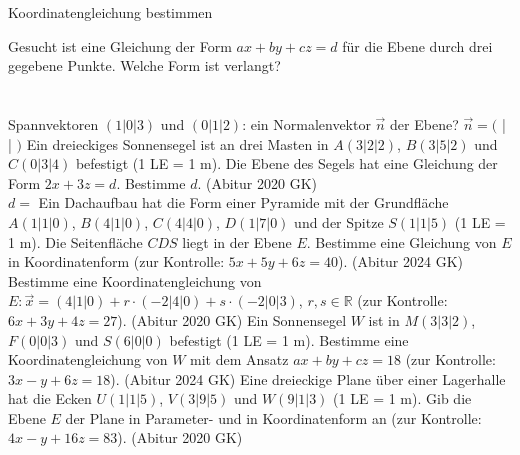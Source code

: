 \setcounter{aufgabe}{11}

\begin{aufgabe}{Koordinatengleichung bestimmen}
\begin{teile}
\teil Gesucht ist eine Gleichung der Form $ax + by + cz = d$ für die Ebene durch drei gegebene Punkte. Welche Form ist verlangt? \\  \\  \\ 
\teil Spannvektoren $(1 | 0 | 3)$ und $(0 | 1 | 2)$: ein Normalenvektor $\vec n$ der Ebene? $\vec n = ($ \leerfeld | \leerfeld | \leerfeld $)$
\teil Ein dreieckiges Sonnensegel ist an drei Masten in $A(3 | 2 | 2)$, $B(3 | 5 | 2)$ und $C(0 | 3 | 4)$ befestigt (1 LE = 1 m). Die Ebene des Segels hat eine Gleichung der Form $2x + 3z = d$. Bestimme $d$. \hfill (Abitur 2020 GK) \\ $d = $ \leerfeld
\teil Ein Dachaufbau hat die Form einer Pyramide mit der Grundfläche $A(1 | 1 | 0)$, $B(4 | 1 | 0)$, $C(4 | 4 | 0)$, $D(1 | 7 | 0)$ und der Spitze $S(1 | 1 | 5)$ (1 LE = 1 m). Die Seitenfläche $CDS$ liegt in der Ebene $E$. Bestimme eine Gleichung von $E$ in Koordinatenform (zur Kontrolle: $5x + 5y + 6z = 40$). \hfill (Abitur 2024 GK)
\teil Bestimme eine Koordinatengleichung von $E\colon \vec x = (4 | 1 | 0) + r \cdot (-2 | 4 | 0) + s \cdot (-2 | 0 | 3)$, $r, s \in \mathbb{R}$ (zur Kontrolle: $6x + 3y + 4z = 27$). \hfill (Abitur 2020 GK)
\teil Ein Sonnensegel $W$ ist in $M(3 | 3 | 2)$, $F(0 | 0 | 3)$ und $S(6 | 0 | 0)$ befestigt (1 LE = 1 m). Bestimme eine Koordinatengleichung von $W$ mit dem Ansatz $ax + by + cz = 18$ (zur Kontrolle: $3x - y + 6z = 18$). \hfill (Abitur 2024 GK)
\teil Eine dreieckige Plane über einer Lagerhalle hat die Ecken $U(1 | 1 | 5)$, $V(3 | 9 | 5)$ und $W(9 | 1 | 3)$ (1 LE = 1 m). Gib die Ebene $E$ der Plane in Parameter- und in Koordinatenform an (zur Kontrolle: $4x - y + 16z = 83$). \hfill (Abitur 2020 GK)

\end{teile}
\end{aufgabe}
